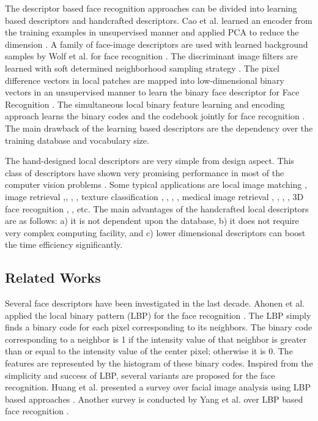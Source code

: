 \documentclass[a4paper]{article}
\begin{document}
The descriptor based face recognition approaches can be divided into learning based descriptors and handcrafted descriptors. Cao et al. learned an encoder from the training examples in unsupervised manner and applied PCA to reduce the dimension \cite{cao2010}. A family of face-image descriptors are used with learned background samples by Wolf et al. for face recognition \cite{wolf2011}. The discriminant image filters are learned with soft determined neighborhood sampling strategy \cite{lei2014}. The pixel difference vectors in local patches are mapped into low-dimensional binary vectors in an unsupervised manner to learn the binary face descriptor for Face Recognition \cite{lu2015learning}. The simultaneous local binary feature learning and encoding approach learns the binary codes and the codebook jointly for face recognition \cite{lu2015simultaneous}. The main drawback of the learning based descriptors are the dependency over the training database and vocabulary size.

The hand-designed local descriptors are very simple from design aspect. This class of descriptors have shown very promising performance in most of the computer vision problems \cite{lbpbook}. Some typical applications are local image matching \cite{iold}, image retrieval \cite{lcod},\cite{ltrp}, \cite{mdlbp}, \cite{boflbp}, texture classification \cite{lbptexture}, \cite{dlbp}, \cite{brint}, \cite{priclbp}, medical image retrieval \cite{lwp}, \cite{lbdp}, \cite{ldep}, \cite{lbdisp}, 3D face recognition \cite{tang20133d}, \cite{elaiwat2014}, etc. The main advantages of the handcrafted local descriptors are as follows: a) it is not dependent upon the database, b) it does not require very complex computing facility, and c) lower dimensional descriptors can boost the time efficiency significantly.

\subsection{Related Works}
Several face descriptors have been investigated in the last decade. Ahonen et al. applied the local binary pattern (LBP) for the face recognition \cite{lbp}. The LBP simply finds a binary code for each pixel corresponding to its neighbors. The binary code corresponding to a neighbor is 1 if the intensity value of that neighbor is greater than or equal to the intensity value of the center pixel; otherwise it is 0. The features are represented by the histogram of these binary codes. Inspired from the simplicity and success of LBP, several variants are proposed for the face recognition. Huang et al. presented a survey over facial image analysis using LBP based approaches \cite{huang2011local}. Another survey is conducted by Yang et al. over LBP based face recognition \cite{yang2013comparative}.
\end{document}
